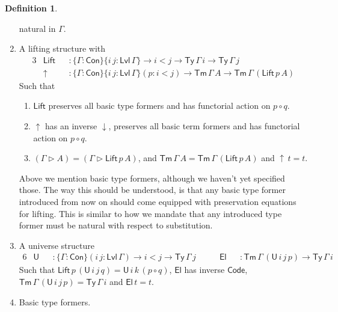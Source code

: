 \documentclass[a4paper,UKenglish,cleveref, autoref, thm-restate]{lipics-v2021}
\theoremstyle{remark}
\theoremstyle{definition}
\newtheorem{mydefinition}{Definition}
\newcommand{\Con}{\mathsf{Con}}
\newcommand{\Ty}{\mathsf{Ty}}
\newcommand{\Tm}{\mathsf{Tm}}
\newcommand{\U}{\mathsf{U}}
\newcommand{\El}{\mathsf{El}}
\newcommand{\ext}{\triangleright}
\newcommand{\up}{\uparrow}
\newcommand{\down}{\downarrow}
\newcommand{\Lift}{\mathsf{Lift}}
\newcommand{\Lvl}{\mathsf{Lvl}}
\renewcommand{\U}{\mathsf{U}}
\newcommand{\Code}{\mathsf{Code}}
\begin{document}
\begin{mydefinition}
\begin{enumerate}
  natural in $\Gamma$.
\item A lifting structure with
  \begin{alignat*}{3}
    &\Lift &&: \{\Gamma : \Con\}\{i\,j : \Lvl\,\Gamma\} \to i < j \to \Ty\,\Gamma\,i \to \Ty\,\Gamma\,j\\
    &\up   &&: \{\Gamma : \Con\}\{i\,j : \Lvl\,\Gamma\}(p : i < j) \to \Tm\,\Gamma\,A \to \Tm\,\Gamma\,(\Lift\,p\,A)
  \end{alignat*}
  Such that
  \vspace{1em}
  \begin{enumerate}
    \item $\Lift$ preserves all basic type formers and has functorial action on $p \circ q$.
    \item $\up$ has an inverse $\down$, preserves all basic term formers and has functorial action on $p \circ q$.
    \item $(\Gamma \ext A) = (\Gamma \ext \Lift\,p\,A)$, and $\Tm\,\Gamma\,A = \Tm\,\Gamma\,(\Lift\,p\,A)$ and $\up\,t = t$.
  \end{enumerate}
  \vspace{1em}
  Above we mention basic type formers, although we haven't yet specified
  those. The way this should be understood, is that any basic type former introduced
  from now on should come equipped with preservation equations for lifting. This is
  similar to how we mandate that any introduced type former must be natural with respect
  to substitution.
\item A universe structure
  \begin{alignat*}{6}
    &\U  &&: \{\Gamma : \Con\}(i\,j : \Lvl\,\Gamma) \to i < j \to \Ty\,\Gamma\,j\hspace{2em}
    &\El &&: \Tm\,\Gamma\,(\U\,i\,j\,p) \to \Ty\,\Gamma\,i
  \end{alignat*}
  Such that $\Lift\,p\,(\U\,i\,j\,q) = \U\,i\,k\,(p \circ q)$, $\El$ has
  inverse $\Code$, $\Tm\,\Gamma\,(\U\,i\,j\,p) = \Ty\,\Gamma\,i$ and $\El\,t =
  t$.
\item Basic type formers.
\end{enumerate}
\end{mydefinition}
\end{document}

